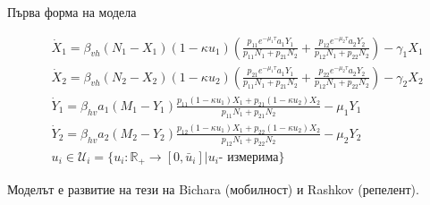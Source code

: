 \begin{frame}[t]{Първа форма на модела}
  \begin{footnotesize}
    \begin{equation}
      \label{eq:TheProblem}
      \begin{split}
        &\dot{X}_1 = \beta_{vh} (N_1-X_1) (1-\kappa u_1) \left(\frac{p_{11} e^{-\mu_1 \tau} a_1 Y_1}{p_{11} N_1 + p_{21} N_2} + \frac{p_{12} e^{-\mu_2 \tau} a_2  Y_2}{p_{12} N_1 + p_{22} N_2}\right) - \gamma_1 X_1 \\
        &\dot{X}_2 = \beta_{vh} (N_2-X_2) (1-\kappa u_2) \left(\frac{p_{21} e^{-\mu_1 \tau} a_1 Y_1}{p_{11} N_1 + p_{21} N_2} + \frac{p_{22} e^{-\mu_2 \tau} a_2 Y_2}{p_{12} N_1 + p_{22} N_2}\right) - \gamma_2 X_2 \\
        &\dot{Y}_1 = \beta_{hv} a_1 (M_1-Y_1) \frac{p_{11} (1-\kappa u_1) X_1 + p_{21} (1-\kappa u_2) X_2}{p_{11} N_1 + p_{21} N_2} - \mu_1 Y_1 \\
        &\dot{Y}_2 = \beta_{hv} a_2 (M_2-Y_2) \frac{p_{12} (1-\kappa u_1) X_1 + p_{22} (1-\kappa u_2) X_2}{p_{12} N_1 + p_{22} N_2} - \mu_2 Y_2 \\
        &u_i \in \mathscr{U}_i = \{u_i:\mathbb{R}_+ \rightarrow [0, \bar{u}_i] \vert u_i \text{- измерима}\}
      \end{split}
    \end{equation}
  \end{footnotesize}
  Моделът е развитие на тези на Bichara \cite{Bichara2016} (мобилност) и Rashkov \cite{Rashkov2022} (репелент).
\end{frame}

